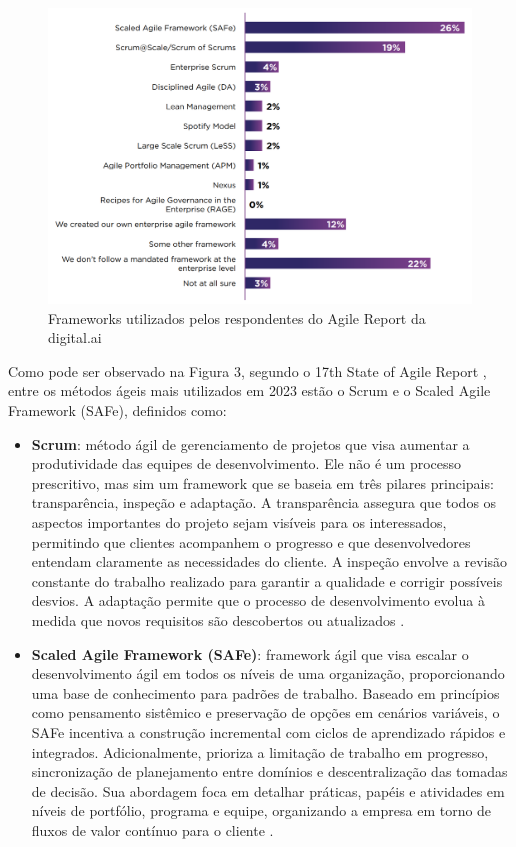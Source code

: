 \documentclass[
	12pt,
	openright,
	twoside,
	a4paper,
	english,
	brazil
	]{abntex2}
\begin{document}
\begin{figure}[H]
	\caption{\label{annual-agile-report}Frameworks utilizados pelos respondentes do Agile Report da digital.ai}
  \includegraphics[width=\textwidth]{annual-agile-report}
\end{figure}

Como pode ser observado na Figura 3, segundo o 17th State of Agile Report \cite{17_agile_report}, entre os métodos ágeis mais utilizados em 2023 estão o Scrum e o Scaled Agile Framework (SAFe), definidos como:
\begin{itemize}
  \item \textbf{Scrum}: método ágil de gerenciamento de projetos que visa aumentar a produtividade das equipes de desenvolvimento. Ele não é um processo prescritivo, mas sim um framework que se baseia em três pilares principais: transparência, inspeção e adaptação. A transparência assegura que todos os aspectos importantes do projeto sejam visíveis para os interessados, permitindo que clientes acompanhem o progresso e que desenvolvedores entendam claramente as necessidades do cliente. A inspeção envolve a revisão constante do trabalho realizado para garantir a qualidade e corrigir possíveis desvios. A adaptação permite que o processo de desenvolvimento evolua à medida que novos requisitos são descobertos ou atualizados \cite{wazlawick2019}.
  \item \textbf{Scaled Agile Framework (SAFe)}: framework ágil que visa escalar o desenvolvimento ágil em todos os níveis de uma organização, proporcionando uma base de conhecimento para padrões de trabalho. Baseado em princípios como pensamento sistêmico e preservação de opções em cenários variáveis, o SAFe incentiva a construção incremental com ciclos de aprendizado rápidos e integrados. Adicionalmente, prioriza a limitação de trabalho em progresso, sincronização de planejamento entre domínios e descentralização das tomadas de decisão. Sua abordagem foca em detalhar práticas, papéis e atividades em níveis de portfólio, programa e equipe, organizando a empresa em torno de fluxos de valor contínuo para o cliente \cite{AgileGuide}.
\end{itemize}
  
\end{document}
